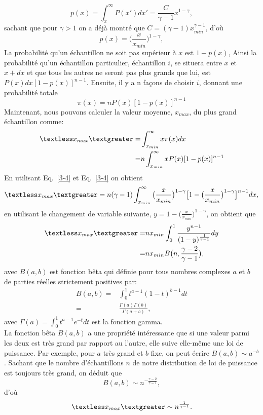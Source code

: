 \begin{equation}
p(x)=\int_{x}^{\infty}P(x')dx'=\frac{C}{\gamma-1}x^{1-\gamma},
\end{equation}
sachant que pour $\gamma>1$ on a déjà montré que $C=(\gamma-1)x_{min}^{\gamma-1}$, d'où 
\begin{equation}
p(x)=\Big(\frac{x}{x_{min}}\Big)^{1-\gamma},
\label{3-8}
\end{equation}
La probabilité qu'un échantillon ne soit pas supérieur à $x$ est $1-p(x)$, Ainsi la probabilité qu'un
échantillon particulier, échantillon $i$, se situera entre $x$ et $x+dx$ et que tous les autres ne seront pas plus grands que lui, est $P(x)dx[1-p(x)]^{n-1}$. Ensuite, il y a n façons de choisir $i$, donnant une probabilité totale
\begin{equation}
\pi(x)=nP(x)[1-p(x)]^{n-1}
\end{equation}
Maintenant, nous pouvons calculer la valeur moyenne, $x_{max}$,  du plus grand échantillon comme:
\begin{align}
\textless x_{max}\textgreater=&\int_{x_{min}}^{\infty}x\pi(x)dx\nonumber \\
=&n\int_{x_{min}}^{\infty}xP(x)[1-p(x)]^{n-1}
\end{align}
En utilisant Eq.~\eqref{3-4}  et Eq.~\eqref{3-4} on obtient
\begin{equation}
\textless x_{max}\textgreater=n(\gamma-1)\int_{x_{min}}^{\infty}\big(\frac{x}{x_{min}}\big)^{1-\gamma}\big[1-\big(\frac{x}{x_{min}}\big)^{1-\gamma}\big]^{n-1}dx,
\end{equation}
en utilisant le changement de variable suivante, $y=1-\big(\frac{x}{x_{min}}\big)^{1-\gamma}$, on obtient que
\begin{align}
\textless x_{max}\textgreater=&nx_{min}\int_{0}^{1}\frac{y^{n-1}}{(1-y)^{\frac{1}{\gamma-1}}}dy\nonumber \\
=&nx_{min}B\big(n,\frac{\gamma-2}{\gamma-1}\big),
\end{align}
avec $B(a,b)$ est fonction bêta qui définie pour tous nombres complexes $a$ et $b$ de parties réelles strictement positives par:
\begin{align}
B(a,b)=&\int_0^1t^{a-1}(1-t)^{b-1}dt\nonumber\\
=&\frac{\Gamma(a)\Gamma(b)}{\Gamma(a+b)},
\end{align}
avec $\Gamma(a)=\int_0^1t^{a-1}e^{-t}dt$ est la fonction gamma.\\

La fonction bêta $B(a,b)$ a une propriété intéressante que si une valeur parmi les deux est très grand par rapport au l'autre, elle suive elle-même une loi de puissance. Par exemple, pour $a$ très grand et $b$ fixe, on peut écrire $B(a,b)\sim a^{-b}$. Sachant que le nombre d'échantillons $n$ de notre distribution de loi de puissance est toujours très grand, on déduit que
\begin{equation}
B(a,b)\sim n^{-\frac{\gamma-2}{\gamma-1}},
\end{equation}
d'où
\begin{equation}
\textless x_{max}\textgreater\sim n^{\frac{1}{\gamma-1}}.
\end{equation}
